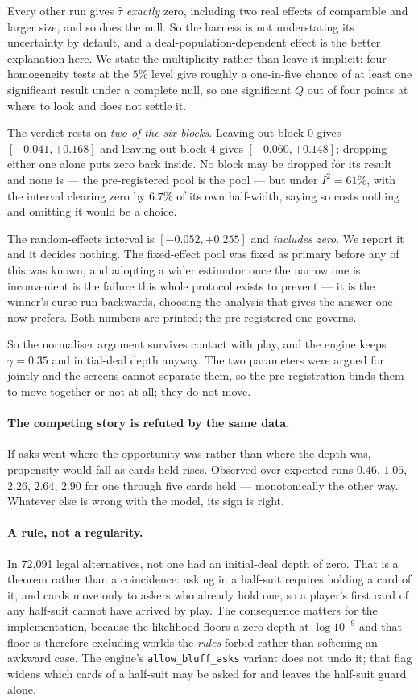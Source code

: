 \documentclass[11pt,a4paper]{article}
\begin{document}
Every other run gives $\hat\tau$ \emph{exactly} zero, including two real effects
of comparable and larger size, and so does the null. So the harness is not
understating its uncertainty by default, and a deal-population-dependent effect
is the better explanation here. We state the multiplicity rather than leave it
implicit: four homogeneity tests at the $5\%$ level give roughly a one-in-five
chance of at least one significant result under a complete null, so one
significant $Q$ out of four points at where to look and does not settle it.

The verdict rests on \emph{two of the six blocks}. Leaving out block 0 gives
$[-0.041, +0.168]$ and leaving out block 4 gives $[-0.060, +0.148]$; dropping
either one alone puts zero back inside. No block may be dropped for its result
and none is --- the pre-registered pool is the pool --- but under $I^2 = 61\%$,
with the interval clearing zero by $6.7\%$ of its own half-width, saying so costs
nothing and omitting it would be a choice.

The random-effects interval is $[-0.052, +0.255]$ and \emph{includes zero}. We
report it and it decides nothing. The fixed-effect pool was fixed as primary
before any of this was known, and adopting a wider estimator once the narrow one
is inconvenient is the failure this whole protocol exists to prevent --- it is
the winner's curse run backwards, choosing the analysis that gives the answer
one now prefers. Both numbers are printed; the pre-registered one governs.

So the normaliser argument survives contact with play, and the engine keeps
$\gamma = 0.35$ and initial-deal depth anyway. The two parameters were argued
for jointly and the screens cannot separate them, so the pre-registration binds
them to move together or not at all; they do not move.

\paragraph{The competing story is refuted by the same data.} If asks went where
the opportunity was rather than where the depth was, propensity would fall as
cards held rises. Observed over expected runs $0.46$, $1.05$, $2.26$, $2.64$,
$2.90$ for one through five cards held --- monotonically the other way. Whatever
else is wrong with the model, its sign is right.

\paragraph{A rule, not a regularity.} In 72{,}091 legal alternatives, not one had
an initial-deal depth of zero. That is a theorem rather than a coincidence:
asking in a half-suit requires holding a card of it, and cards move only to
askers who already hold one, so a player's first card of any half-suit cannot
have arrived by play. The consequence matters for the implementation, because
the likelihood floors a zero depth at $\log 10^{-9}$ and that floor is therefore
excluding worlds the \emph{rules} forbid rather than softening an awkward case.
The engine's \texttt{allow\_bluff\_asks} variant does not undo it; that flag
widens which cards of a half-suit may be asked for and leaves the half-suit
guard alone.
\end{document}
